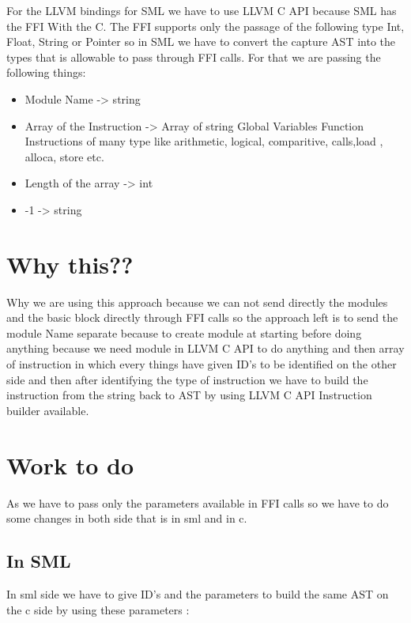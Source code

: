 \documentclass[openany]{book}
\begin{document}
For the LLVM bindings for SML we have to use LLVM C API because SML has the FFI With the C. The FFI supports only the passage of the following type Int, Float, String or Pointer so in SML we have to convert the capture AST into the types that is allowable to pass through FFI calls. For that we are passing the following things: \newpage

\begin{itemize}
	\item Module Name  -> string
	\item Array of the Instruction -> Array of string
	\subitem Global Variables   
	\subitem Function 
	\subitem Instructions of many type like arithmetic, logical, comparitive, calls,load , alloca, store etc.
	\item Length of the array -> int 
	\item -1 -> string 
\end{itemize}
	
\section{Why this??}
Why we are using this approach because we can not send directly the modules and the basic block directly through FFI calls so the approach left is to send the module Name separate because to create module at starting before doing anything because we need module in LLVM C API to do anything and then array of instruction in which every things have given ID's to be identified on the other side and then after identifying the type of instruction we have to build the instruction from the string back to AST by using LLVM C API Instruction builder available.

\section{Work to do}
As we have to pass only the parameters available in FFI calls so we have to do some changes in both side that is in sml and in c.

\subsection{In SML}
In sml side we have to give ID's and the parameters to build the same AST on the c side by using these parameters :\newpage
\end{document}
